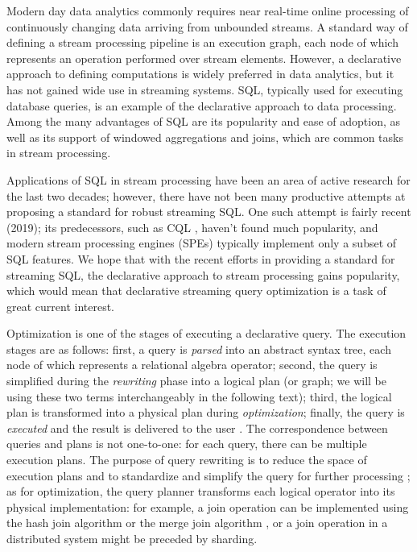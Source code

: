 \label {fs-optimization-introduction}

Modern day data analytics commonly requires near real-time online processing of continuously changing data arriving from unbounded streams. A standard way of defining a stream processing pipeline is an execution graph, each node of which represents an operation performed over stream elements. However, a declarative approach to defining computations is widely preferred in data analytics, but it has not gained wide use in streaming systems. SQL, typically used for executing database queries, is an example of the declarative approach to data processing. Among the many advantages of SQL are its popularity and ease of adoption, as well as its support of windowed aggregations and joins, which are common tasks in stream processing. 

Applications of SQL in stream processing have been an area of active research for the last two decades; however, there have not been many productive attempts at proposing a standard for robust streaming SQL. One such attempt \cite{Begoli:2019:OSR:3299869.3314040} is fairly recent (2019); its predecessors, such as CQL \cite{Arasu:2006:CCQ:1146461.1146463}, haven't found much popularity, and modern stream processing engines (SPEs) typically implement only a subset of SQL features. We hope that with the recent efforts in providing a standard for streaming SQL, the declarative approach to stream processing gains popularity, which would mean that declarative streaming query optimization is a task of great current interest.

Optimization is one of the stages of executing a declarative query. The execution stages are as follows: first, a query is \textit{parsed} into an abstract syntax tree, each node of which represents a relational algebra operator; second, the query is simplified during the \textit{rewriting} phase into a logical plan (or graph; we will be using these two terms interchangeably in the following text); third, the logical plan is transformed into a physical plan during \textit{optimization}; finally, the query is \textit{executed} and the result is delivered to the user \cite{Pitoura2018processing}. The correspondence between queries and plans is not one-to-one: for each query, there can be multiple execution plans. The purpose of query rewriting is to reduce the space of execution plans and to standardize and simplify the query for further processing \cite{Pitoura2018rewriting}; as for optimization, the query planner transforms each logical operator into its physical implementation: for example, a join operation can be implemented using the hash join algorithm or the merge join algorithm \cite{Neumann2018optimization}, or a join operation in a distributed system might be preceded by sharding.  

